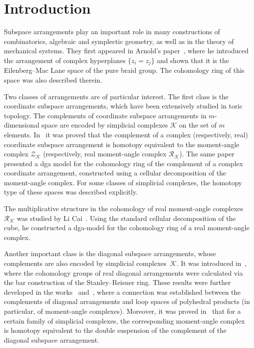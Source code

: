 \documentclass[a4paper,12pt]{amsart}
\newcommand{\K}{\mathcal K}
\theoremstyle{definition}
\theoremstyle{remark}
\numberwithin{equation}{section}
\begin{document}
\maketitle

\section{Introduction}
Subspace arrangements play an important role in many constructions of combinatorics, algebraic and symplectic geometry, as well as in the theory of mechanical systems. They first appeared in Arnold's paper~\cite{Arn69}, where he introduced the arrangement of complex hyperplanes $\{z_i = z_j \}$ and shown that it is the Eilenberg--Mac Lane space of the pure braid group. 
The cohomology ring of this space was also described therein.

Two classes of arrangements are of particular interest.
The first class is the coordinate subspace arrangements, which have been extensively studied in toric topology. The complements of coordinate subspace arrangements in $m$-dimensional space are encoded by simplicial complexes $\K$ on the set of $m$ elements. In~\cite{BP00} it was proved that the complement of a complex (respectively, real) coordinate subspace arrangement is homotopy equivalent to the moment-angle complex $\mathcal Z_{\mathcal K}$ (respectively, real moment-angle complex $\mathcal R_{\mathcal K}$). The same paper presented a dga model for the cohomology ring of the complement of a complex coordinate arrangement, constructed using a cellular decomposition of the moment-angle complex. For some classes of simplicial complexes, the homotopy type of these spaces was described explicitly.

The multiplicative structure in the cohomology of real moment-angle complexes $\mathcal R_{\mathcal K}$ was studied by Li Cai~\cite{LiCai}. Using the standard cellular decomposition of the cube, he constructed a dga-model for the cohomology ring of a real moment-angle complex.

Another important class is the diagonal subspace arrangements, whose complements are also encoded by simplicial complexes~$\mathcal K$.
It was introduced in~\cite{PRW}, where the cohomology groups of real diagonal arrangements were calculated via the bar construction of the Stanley--Reisner ring.
These results were further developed in the works~\cite{BP00} and~\cite{Dobr09}, where a connection was established between the complements of diagonal arrangements and loop spaces of polyhedral products (in particular, of moment-angle complexes). Moreover, it was proved in~\cite{T} that for a certain family of simplicial complexes, the corresponding moment-angle complex is homotopy equivalent to the double suspension of the complement of the diagonal subspace arrangement.
\end{document}
